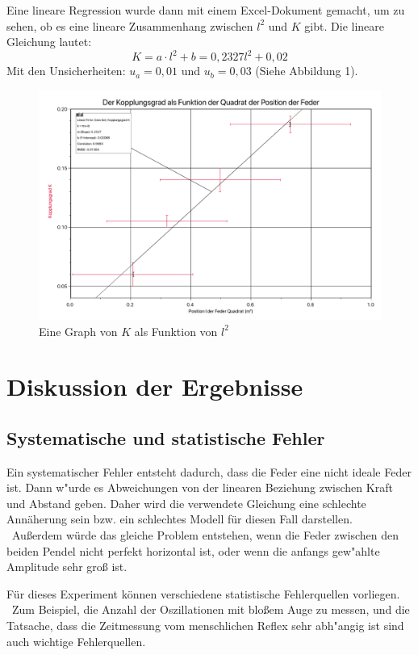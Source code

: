 \documentclass[11pt,a4paper]{article}
\begin{document}
Eine lineare Regression wurde dann mit einem Excel-Dokument gemacht, um zu sehen, ob es eine lineare Zusammenhang zwischen $l^2$ und $K$ gibt. Die lineare Gleichung lautet:
$$ K = a\cdot l^2 +b = 0,2327 l^2 + 0,02 $$
Mit den Unsicherheiten: $u_a = 0,01$ und $u_b = 0,03$ (Siehe Abbildung 1). 
\begin{figure}[h]
	\centering
	\includegraphics[width=\textwidth]{Abb2}
	\caption{Eine Graph von $K$ als Funktion von $l^2$}
\end{figure}

\section{Diskussion der Ergebnisse}
\subsection{Systematische und statistische Fehler}
Ein systematischer Fehler entsteht dadurch, dass die Feder eine nicht ideale Feder ist.
Dann w"urde es Abweichungen von der linearen Beziehung zwischen Kraft und Abstand geben. Daher wird die verwendete Gleichung eine schlechte Annäherung sein bzw. ein schlechtes Modell für diesen Fall darstellen.
\\\
Außerdem würde das gleiche Problem entstehen, wenn die Feder zwischen den beiden Pendel nicht perfekt horizontal ist, oder wenn die anfangs gew"ahlte Amplitude sehr groß ist.

Für dieses Experiment können verschiedene statistische Fehlerquellen vorliegen.
\\\
Zum Beispiel, die Anzahl der Oszillationen mit bloßem Auge zu messen, und die Tatsache, dass die Zeitmessung vom menschlichen Reflex sehr abh"angig ist sind auch wichtige Fehlerquellen. 
\end{document}
